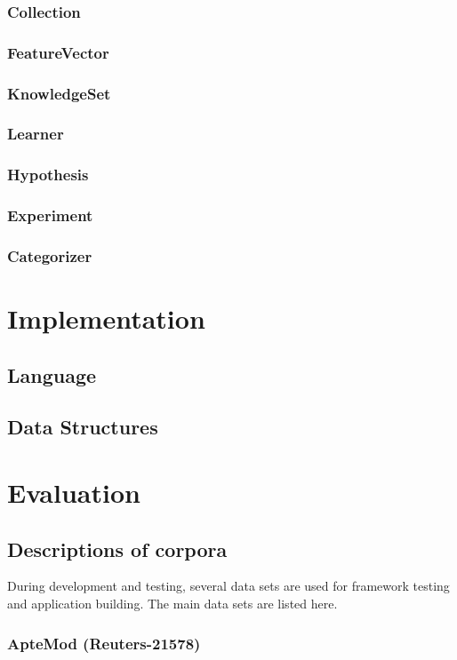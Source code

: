 \documentclass[a4paper]{report}
\begin{document}
\subsection{Collection}
\subsection{FeatureVector}
\subsection{KnowledgeSet}
\subsection{Learner}
\subsection{Hypothesis}
\subsection{Experiment}
\subsection{Categorizer}


\chapter{Implementation}

\section{Language}
\section{Data Structures}

\chapter{Evaluation}

\section{Descriptions of corpora}
During development and testing, several data sets are used for
framework testing and application building.  The main data sets are
listed here.


\subsection{ApteMod (Reuters-21578)}
\end{document}
